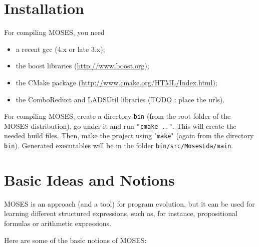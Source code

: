 \documentclass{article}
\begin{document}
\section{Installation}



For compiling MOSES, you need 
\begin{itemize}
\item a recent gcc (4.x or late 3.x); 
\item the boost libraries (\url{http://www.boost.org});
\item the CMake package (\url{http://www.cmake.org/HTML/Index.html});
\item the ComboReduct and LADSUtil libraries (TODO : place the urls).
\end{itemize}

For compiling MOSES, create a directory \verb|bin| (from the root folder
of the MOSES distribution), go under it
and run \verb|"cmake .."|. This will create 
the needed build files. Then, make the project using "\verb|make|" (again 
from the directory \verb|bin|).
Generated executables will be in the folder \verb|bin/src/MosesEda/main|.


\section{Basic Ideas and Notions}

MOSES is an approach (and a tool) for program evolution, but it can be
used for learning different structured expressions, such as, for instance,
propositional formulas or arithmetic expressions.

Here are some of the basic notions of MOSES:
\end{document}
